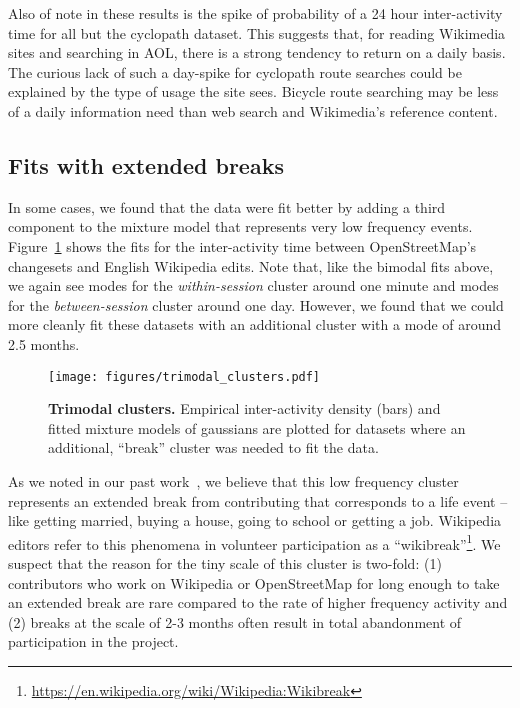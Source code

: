 Also of note in these results is the spike of probability of a 24 hour inter-activity time for all but the cyclopath dataset.  This suggests that, for reading Wikimedia sites and searching in AOL, there is a strong tendency to return on a daily basis.  The curious lack of such a day-spike for cyclopath route searches could be explained by the type of usage the site sees. Bicycle route searching may be less of a daily information need than web search and Wikimedia's reference content.

\subsection{Fits with extended breaks}

In some cases, we found that the data were fit better by adding a third component to the mixture model that represents very low frequency events.  Figure~\ref{fig:trimodal_clusters} shows the fits for the inter-activity time between OpenStreetMap's changesets and English Wikipedia edits.  Note that, like the bimodal fits above, we again see modes for the \emph{within-session} cluster around one minute and modes for the \emph{between-session} cluster around one day.  However, we found that we could more cleanly fit these datasets with an additional cluster with a mode of around 2.5 months.

\begin{figure}
\centering
\texttt{[image: figures/trimodal\_clusters.pdf]}
\caption{
    \textbf{Trimodal clusters.} Empirical inter-activity density (bars) and fitted mixture models of gaussians are plotted for datasets where an additional, ``break'' cluster was needed to fit the data.
}
\label{fig:trimodal_clusters}
\end{figure}

As we noted in our past work~\cite{geiger2013using}, we believe that this low frequency cluster represents an extended break from contributing that corresponds to a life event -- like getting married, buying a house, going to school or getting a job.  Wikipedia editors refer to this phenomena in volunteer participation as a ``wikibreak''\footnote{\url{https://en.wikipedia.org/wiki/Wikipedia:Wikibreak}}.  We suspect that the reason for the tiny scale of this cluster is two-fold: (1) contributors who work on Wikipedia or OpenStreetMap for long enough to take an extended break are rare compared to the rate of higher frequency activity and (2) breaks at the scale of 2-3 months often result in total abandonment of participation in the project.

